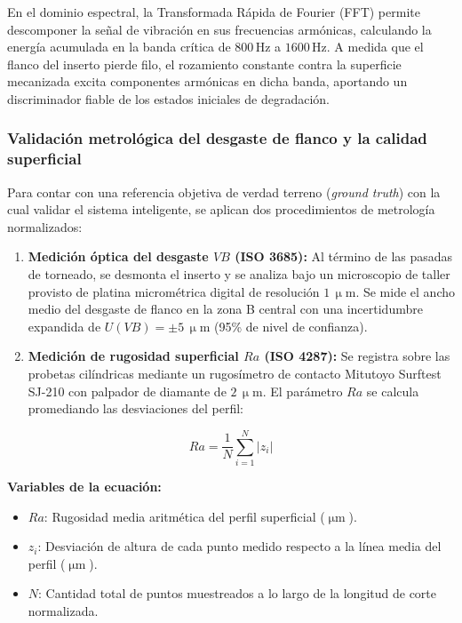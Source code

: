 En el dominio espectral, la Transformada Rápida de Fourier (FFT) permite descomponer la señal de vibración en sus frecuencias armónicas, calculando la energía acumulada en la banda crítica de $800\,\text{Hz}$ a $1600\,\text{Hz}$. A medida que el flanco del inserto pierde filo, el rozamiento constante contra la superficie mecanizada excita componentes armónicas en dicha banda, aportando un discriminador fiable de los estados iniciales de degradación.


\subsubsection{Validación metrológica del desgaste de flanco y la calidad superficial}

Para contar con una referencia objetiva de verdad terreno (\textit{ground truth}) con la cual validar el sistema inteligente, se aplican dos procedimientos de metrología normalizados:
\begin{enumerate}
    \item \textbf{Medición óptica del desgaste $VB$ (ISO 3685):} Al término de las pasadas de torneado, se desmonta el inserto y se analiza bajo un microscopio de taller provisto de platina micrométrica digital de resolución $1\,\upmu\text{m}$. Se mide el ancho medio del desgaste de flanco en la zona B central con una incertidumbre expandida de $U(VB) = \pm 5\,\upmu\text{m}$ (95\% de nivel de confianza).
    \item \textbf{Medición de rugosidad superficial $Ra$ (ISO 4287):} Se registra sobre las probetas cilíndricas mediante un rugosímetro de contacto Mitutoyo Surftest SJ-210 con palpador de diamante de $2\,\upmu\text{m}$. El parámetro $Ra$ se calcula promediando las desviaciones del perfil:
\end{enumerate}

\begin{equation}
Ra = \frac{1}{N} \sum_{i=1}^{N} |z_i|
\label{eq:rugosidad_ra}
\end{equation}

\noindent\textbf{Variables de la ecuación:}
\begin{itemize}
    \item $Ra$: Rugosidad media aritmética del perfil superficial ($\upmu\text{m}$).
    \item $z_i$: Desviación de altura de cada punto medido respecto a la línea media del perfil ($\upmu\text{m}$).
    \item $N$: Cantidad total de puntos muestreados a lo largo de la longitud de corte normalizada.
\end{itemize}


